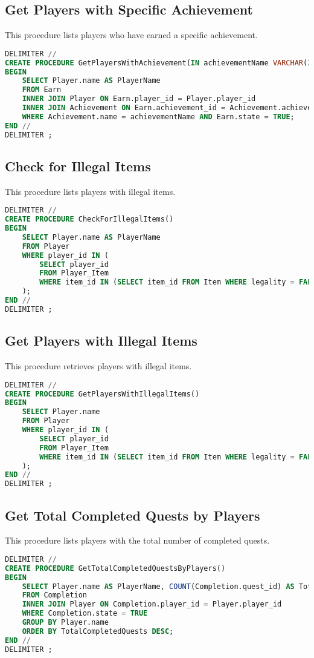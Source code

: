 \documentclass{article}
\begin{document}
\subsection{Get Players with Specific Achievement}
This procedure lists players who have earned a specific achievement.
\begin{lstlisting}[language=sql,caption=Get Players with Specific Achievement]
DELIMITER //
CREATE PROCEDURE GetPlayersWithAchievement(IN achievementName VARCHAR(255))
BEGIN
    SELECT Player.name AS PlayerName
    FROM Earn
    INNER JOIN Player ON Earn.player_id = Player.player_id
    INNER JOIN Achievement ON Earn.achievement_id = Achievement.achievement_id
    WHERE Achievement.name = achievementName AND Earn.state = TRUE;
END //
DELIMITER ;
\end{lstlisting}

\subsection{Check for Illegal Items}
This procedure lists players with illegal items.
\begin{lstlisting}[language=sql,caption=Check for Illegal Items]
DELIMITER //
CREATE PROCEDURE CheckForIllegalItems()
BEGIN
    SELECT Player.name AS PlayerName
    FROM Player
    WHERE player_id IN (
        SELECT player_id
        FROM Player_Item
        WHERE item_id IN (SELECT item_id FROM Item WHERE legality = FALSE)
    );
END //
DELIMITER ;
\end{lstlisting}

\subsection{Get Players with Illegal Items}
This procedure retrieves players with illegal items.
\begin{lstlisting}[language=sql,caption=Get Players with Illegal Items]
DELIMITER //
CREATE PROCEDURE GetPlayersWithIllegalItems()
BEGIN
    SELECT Player.name
    FROM Player
    WHERE player_id IN (
        SELECT player_id
        FROM Player_Item
        WHERE item_id IN (SELECT item_id FROM Item WHERE legality = FALSE)
    );
END //
DELIMITER ;
\end{lstlisting}

\subsection{Get Total Completed Quests by Players}
This procedure lists players with the total number of completed quests.
\begin{lstlisting}[language=sql,caption=Get Total Completed Quests by Players]
DELIMITER //
CREATE PROCEDURE GetTotalCompletedQuestsByPlayers()
BEGIN
    SELECT Player.name AS PlayerName, COUNT(Completion.quest_id) AS TotalCompletedQuests
    FROM Completion
    INNER JOIN Player ON Completion.player_id = Player.player_id
    WHERE Completion.state = TRUE
    GROUP BY Player.name
    ORDER BY TotalCompletedQuests DESC;
END //
DELIMITER ;
\end{lstlisting}
\end{document}
